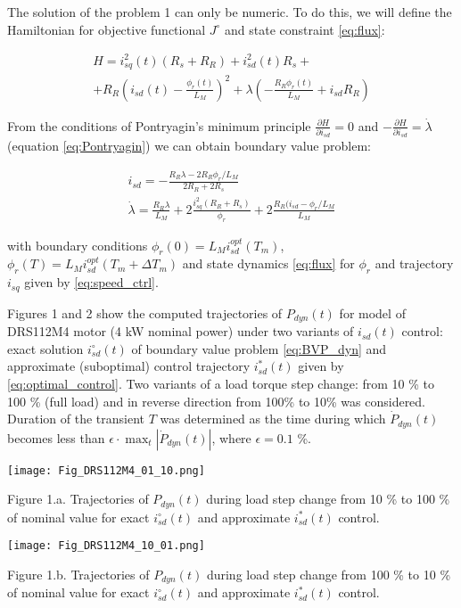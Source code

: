 \documentclass[journal]{IEEEtran}
\begin{document}
The solution of the problem 1 can only be numeric. To do this, we will define the Hamiltonian for objective functional $J^\circ$ and state constraint \eqref{eq:flux}:

\begin{equation}
\begin{gathered}
H = i_{sq}^2(t) (R_s + R_R) + i_{sd}^2(t) R_s + \\
+ R_R \left ( i_{sd}(t) - \frac{\phi_r(t)}{L_M} \right )^2 + \lambda (-\frac{R_R \phi_r(t)}{L_M} + i_{sd} R_R )
\end{gathered}
\end{equation}

From the conditions of Pontryagin's minimum principle $\frac{\partial H}{\partial i_{sd}} = 0$ and $-\frac{\partial H}{\partial i_{sd}} = \dot \lambda$ (equation \eqref{eq:Pontryagin}) we can obtain boundary value problem:

\begin{equation}\label{eq:BVP_dyn}
\begin{gathered}
i_{sd} = -\frac{R_R \lambda - 2 R_R \phi_r/L_M}{2 R_R + 2 R_s} \\
\dot \lambda = \frac{R_R \lambda}{L_M} + 2 \frac{i_{sq}^2 (R_R + R_s)}{\phi_r} + 2 \frac{R_R (i_{sd} - \phi_r/L_M}{L_M}
\end{gathered}
\end{equation}

with boundary conditions $\phi_r(0) = L_M i_{sd}^{opt}(T_m)$, $\phi_r(T) = L_M i_{sd}^{opt}(T_m + \Delta T_m)$ and state dynamics \eqref{eq:flux} for $\phi_r$ and trajectory $i_{sq}$ given by \eqref{eq:speed_ctrl}.

Figures 1 and 2 show the computed trajectories of $P_{dyn}(t)$ for model of DRS112M4 motor (4 kW nominal power) under two variants of $i_{sd}(t)$ control: exact solution $i_{sd}^\circ(t)$ of boundary value problem \eqref{eq:BVP_dyn} and approximate (suboptimal) control trajectory $i_{sd}^*(t)$ given by \eqref{eq:optimal_control}. Two variants of a load torque step change: from 10 \% to 100 \% (full load) and in reverse direction from 100\% to 10\% was considered. Duration of the transient $T$ was determined as the time during which $\dot P_{dyn}(t)$ becomes less than $\epsilon \cdot \max_t | \dot P_{dyn}(t) |$, where $\epsilon = 0.1$ \%.

\begin{center}
\ifpdf \texttt{[image: Fig\_DRS112M4\_01\_10.png]}
\fi

Figure 1.a. Trajectories of $P_{dyn}(t)$ during load step change from 10 \% to 100 \% of nominal value for exact $i_{sd}^\circ(t)$ and approximate $i_{sd}^*(t)$ control.

\ifpdf \texttt{[image: Fig\_DRS112M4\_10\_01.png]}
\fi

Figure 1.b. Trajectories of $P_{dyn}(t)$ during load step change from 100 \% to 10 \% of nominal value for exact $i_{sd}^\circ(t)$ and approximate $i_{sd}^*(t)$ control.
\end{center}
\end{document}

